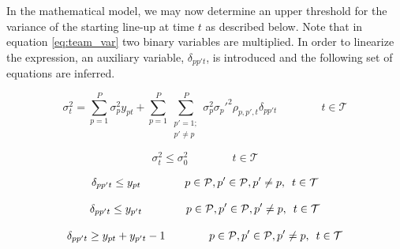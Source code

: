 In the mathematical model, we may now determine an upper threshold for the variance of the starting line-up at time $t$ as described below. Note that in equation \ref{eq:team_var} two binary variables are multiplied. In order to linearize the expression, an auxiliary variable, $\delta_{pp't}$, is introduced and the following set of equations are inferred.

\begin{equation} \label{eq:variance}
    \sigma^2_{t} = \sum_{p = 1}^{P}\sigma_p^2 y_{pt} + \sum_{p = 1}^{P}\sum_{\substack{p' = 1; \\ p' \neq p}}^{P} \sigma_p^2\sigma_p'^2\rho_{p,p',t} \delta_{pp't} \qquad\qquad t \in \mathcal{T}
\end{equation}

\begin{equation} \label{eq:variance_threshold}
    \sigma^2_{t} \leq \sigma_{0}^2 \qquad\qquad t \in \mathcal{T}
\end{equation}

\begin{equation} \label{eq:variance_p_beta}
    \delta_{pp't} \leq y_{pt}  \qquad\qquad p \in \mathcal{P}, p' \in \mathcal{P}, p' \neq p, \enskip t \in \mathcal{T}
\end{equation}

\begin{equation} \label{eq:variance_p_dash_beta}
    \delta_{pp't} \leq y_{p't}  \qquad\qquad p \in \mathcal{P}, p' \in \mathcal{P}, p' \neq p, \enskip t \in \mathcal{T}
\end{equation}

\begin{equation} \label{eq:variance_p_p_dash_beta}
    \delta_{pp't} \geq y_{pt} + y_{p't} - 1  \qquad\qquad p \in \mathcal{P}, p' \in \mathcal{P}, p' \neq p, \enskip t \in \mathcal{T}
\end{equation}

